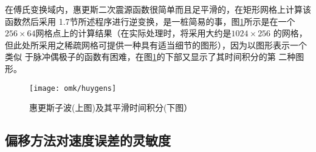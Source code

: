 在傅氏变换域内，惠更斯二次震源函数很简单而且足平滑的，在矩形网格上计算该函数然后采用
1.7节所述程序进行逆变换，是一桩简易的事，图\ref{fig:omk/huygens}所示是在一个
$256\times 64$网格点上的计算结果（在实际处理时，将采用大约是$1024\times 256$
的网格，但此处所采用之稀疏网格可提供一种具有适当细节的图形），因为以图形表示一个类似
于脉冲偶极子的函数有困难，在图\ref{fig:omk/huygens}的下部又显示了其时间积分的第
二种图形。
\begin{figure}[H]
\centering
\texttt{[image: omk/huygens]}
\caption[huygens]{惠更斯子波(上图)及其平滑时间积分(下图）}
\label{fig:omk/huygens}
\end{figure}

\subsection{偏移方法对速度误差的灵敏度}
\label{sec:1.3.8}

